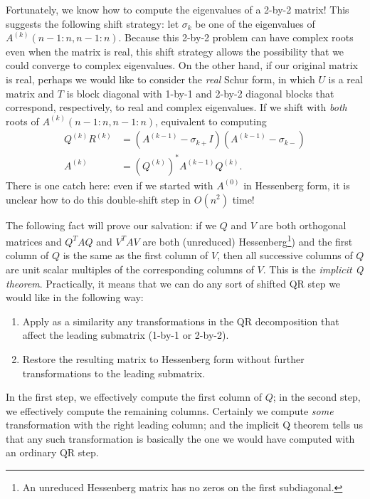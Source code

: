 \documentclass[12pt, leqno]{article} %
\begin{document}
Fortunately, we know how to compute the eigenvalues of a 2-by-2
matrix!  This suggests the following shift strategy: let $\sigma_k$ be
one of the eigenvalues of $A^{(k)}(n-1:n,n-1:n)$.  Because this 2-by-2
problem can have complex roots even when the matrix is real, this
shift strategy allows the possibility that we could converge to
complex eigenvalues. On the other hand, if our original matrix is
real, perhaps we would like to consider the {\em real} Schur form, in
which $U$ is a real matrix and $T$ is block diagonal with 1-by-1 and
2-by-2 diagonal blocks that correspond, respectively, to real and
complex eigenvalues.  If we shift with {\em both} roots of
$A^{(k)}(n-1:n,n-1:n)$, equivalent to computing
\begin{align*}
  Q^{(k)} R^{(k)} &= (A^{(k-1)} - \sigma_{k+} I)(A^{(k-1)} - \sigma_{k-}) \\
  A^{(k)} &= (Q^{(k)})^* A^{(k-1)} Q^{(k)}. \label{sqr-2}
\end{align*}
There is one catch here: even if we started with $A^{(0)}$ in Hessenberg
form, it is unclear how to do this double-shift step in $O(n^2)$ time!

The following fact will prove our salvation: if we $Q$ and $V$ are
both orthogonal matrices and $Q^T A Q$ and $V^T A V$ are both
(unreduced) Hessenberg\footnote{ An unreduced Hessenberg matrix has no
  zeros on the first subdiagonal.  })  and the first column of $Q$ is
the same as the first column of $V$, then all successive columns of
$Q$ are unit scalar multiples of the corresponding columns of $V$.
This is the {\em implicit Q theorem}.  Practically, it means that we
can do any sort of shifted QR step we would like in the following way:
\begin{enumerate}
\item
  Apply as a similarity any transformations in the QR decomposition
  that affect the leading submatrix (1-by-1 or 2-by-2).
\item
  Restore the resulting matrix to Hessenberg form without further
  transformations to the leading submatrix.
\end{enumerate}
In the first step, we effectively compute the first column of $Q$;
in the second step, we effectively compute the remaining columns.
Certainly we compute {\em some} transformation with the right leading
column; and the implicit Q theorem tells us that any such transformation
is basically the one we would have computed with an ordinary QR step.
\end{document}
